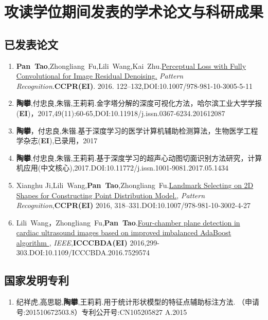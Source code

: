 
\chapter{攻读学位期间发表的学术论文与科研成果}

\section*{已发表论文}
\begin{enumerate}
\item {\textbf{Pan~Tao},Zhongliang~Fu,Lili~Wang,Kai~Zhu.{\href{http://link.springer.com/10.1007/978-981-10-3005-5_11}{Perceptual Loss with Fully Convolutional for Image Residual Denoising.}{ \textit{Pattern Recognition}}.\textbf{CCPR(EI)}. 2016. 122--132,DOI:10.1007/978-981-10-3005-5-11}}

\item {\textbf{陶攀},付忠良,朱锴,王莉莉.{金字塔分解的深度可视化方法}，{哈尔滨工业大学学报(\textbf{EI})}，2017,49(11):60-65,DOI:10.11918/j.issn.0367-6234.201612087}
\item{\textbf{陶攀}，付忠良,朱锴.{基于深度学习的医学计算机辅助检测算法}，{生物医学工程学杂志(\textbf{EI}),已录用}，2017}
\item {\textbf{陶攀},付忠良,朱锴,王莉莉.{基于深度学习的超声心动图切面识别方法研究}，{计算机应用(中文核心),2017.DOI:10.11772/j.issn.1001-9081.2017.05.1434} }
\item{Xianghu Ji,Lili~Wang,\textbf{Pan~Tao},Zhongliang~Fu.{\href{http://link.springer.com/10.1007/978-981-10-3002-4_27}{Landmark Selecting on 2D Shapes for Constructing Point Distribution Model.},{ \textit{Pattern Recognition}},\textbf{CCPR(EI)} 2016, 318--331.DOI:10.1007/978-981-10-3002-4-27}}
\item {Lili~Wang，Zhongliang~Fu,\textbf{Pan~Tao}.{\href{http://ieeexplore.ieee.org/document/7529574}{Four-chamber plane detection in cardiac ultrasound images based on improved imbalanced AdaBoost algorithm },{ \textit{IEEE}},\textbf{ICCCBDA(EI)} 2016,299-303.DOI:10.1109/ICCCBDA.2016.7529574}}
\end{enumerate}
\section*{国家发明专利}
\begin{enumerate}
\item { 纪祥虎,高思聪,\textbf{陶攀},王莉莉.{用于统计形状模型的特征点辅助标注方法. {（申请号:201510672503.8）专利公开号:CN105205827 A}.{2015}}}
\end{enumerate}
